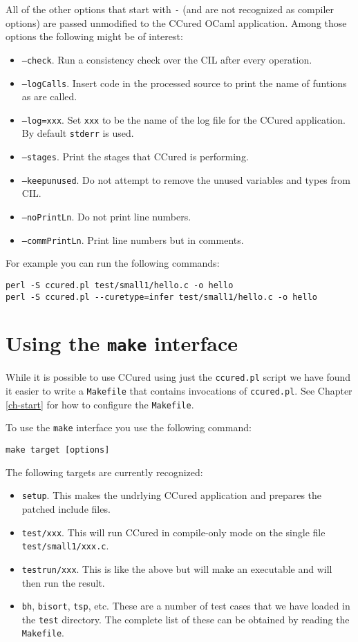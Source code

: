 \documentclass{book}
\def\t#1{{\tt #1}}
\begin{document}
 All of the other options that start with \t{-} (and are not recognized as
compiler options) are passed unmodified to the CCured OCaml application. Among
those options the following might be of interest:
\begin{itemize}
\item \t{--check}. Run a consistency check over the CIL after every operation. 
\item \t{--logCalls}. Insert code in the processed source to print the name of
funtions as are called. 
\item \t{--log=xxx}. Set \t{xxx} to be the name of the log file for the CCured
application. By default \t{stderr} is used.
\item \t{--stages}. Print the stages that CCured is performing.
\item \t{--keepunused}. Do not attempt to remove the unused variables and
types from CIL. 
\item \t{--noPrintLn}. Do not print line numbers.
\item \t{--commPrintLn}. Print line numbers but in comments.
\end{itemize}

 For example you can run the following commands:
\begin{verbatim}
perl -S ccured.pl test/small1/hello.c -o hello
perl -S ccured.pl --curetype=infer test/small1/hello.c -o hello
\end{verbatim}

 \section{Using the {\tt make} interface}

 While it is possible to use CCured using just the \t{ccured.pl} script we
have found it easier to write a \t{Makefile} that contains invocations of
\t{ccured.pl}. See Chapter \ref{ch-start} for how to configure the
\t{Makefile}. 
 
 To use the \t{make} interface you use the following command:
\begin{verbatim}
make target [options]
\end{verbatim}

 The following targets are currently recognized:
\begin{itemize}
\item \t{setup}. This makes the undrlying CCured application and prepares the
patched include files.
\item \t{test/xxx}.  This will run CCured in compile-only mode on the single
file \t{test/small1/xxx.c}. 
\item \t{testrun/xxx}. This is like the above but will make an executable and
will then run the result. 
\item \t{bh}, \t{bisort}, \t{tsp}, etc. These are a number of test cases that
we have loaded in the \t{test} directory. The complete list of these can be
obtained by reading the \t{Makefile}.
\end{itemize}
\end{document}
